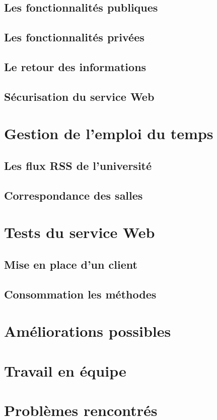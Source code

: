 \subsection{Les fonctionnalit\'es publiques}

\subsection{Les fonctionnalit\'es priv\'ees}

\subsection{Le retour des informations}

\subsection{S\'ecurisation du service Web}
\label{section:securisation}

\section{Gestion de l'emploi du temps}

\subsection{Les flux RSS de l'universit\'e}

\subsection{Correspondance des salles}

\section{Tests du service Web}

\subsection{Mise en place d'un client}

\subsection{Consommation les m\'ethodes}

\section{Am\'eliorations possibles}

\section{Travail en \'equipe}

\section{Probl\`emes rencontr\'es}


\clearpage

